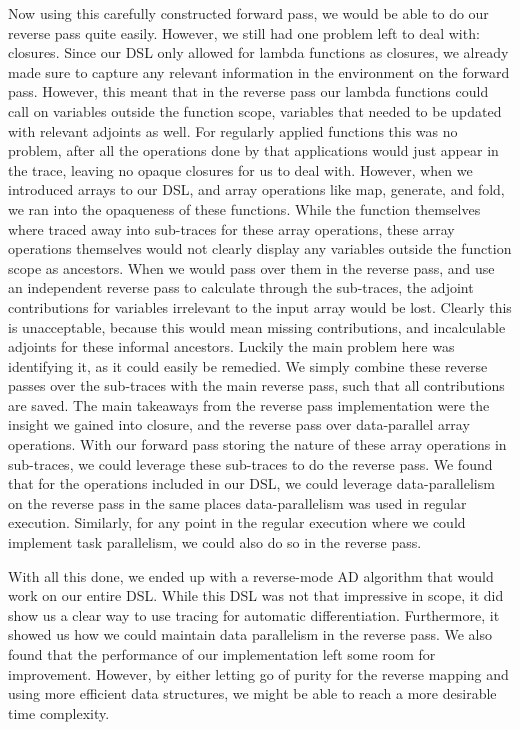     Now using this carefully constructed forward pass, we would be able to do our reverse pass quite easily.
    However, we still had one problem left to deal with: closures.
    Since our DSL only allowed for lambda functions as closures, we already made sure to capture any relevant information in the environment on the forward pass.
    However, this meant that in the reverse pass our lambda functions could call on variables outside the function scope, variables that needed to be updated with relevant adjoints as well.
    For regularly applied functions this was no problem, after all the operations done by that applications would just appear in the trace, leaving no opaque closures for us to deal with.
    However, when we introduced arrays to our DSL, and array operations like map, generate, and fold, we ran into the opaqueness of these functions.
    While the function themselves where traced away into sub-traces for these array operations, these array operations themselves would not clearly display any variables outside the function scope as ancestors.
    When we would pass over them in the reverse pass, and use an independent reverse pass to calculate through the sub-traces, the adjoint contributions for variables irrelevant to the input array would be lost.
    Clearly this is unacceptable, because this would mean missing contributions, and incalculable adjoints for these informal ancestors.
    Luckily the main problem here was identifying it, as it could easily be remedied. 
    We simply combine these reverse passes over the sub-traces with the main reverse pass, such that all contributions are saved.
    The main takeaways from the reverse pass implementation were the insight we gained into closure, and the reverse pass over data-parallel array operations.
    With our forward pass storing the nature of these array operations in sub-traces, we could leverage these sub-traces to do the reverse pass.
    We found that for the operations included in our DSL, we could leverage data-parallelism on the reverse pass in the same places data-parallelism was used in regular execution.
    Similarly, for any point in the regular execution where we could implement task parallelism, we could also do so in the reverse pass.

    With all this done, we ended up with a reverse-mode AD algorithm that would work on our entire DSL.
    While this DSL was not that impressive in scope, it did show us a clear way to use tracing for automatic differentiation.
    Furthermore, it showed us how we could maintain data parallelism in the reverse pass.
    We also found that the performance of our implementation left some room for improvement.
    However, by either letting go of purity for the reverse mapping and using more efficient data structures, we might be able to reach a more desirable time complexity.

